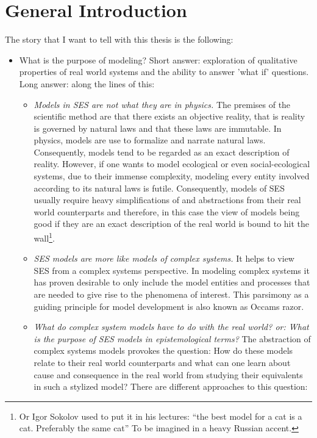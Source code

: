 \chapter{General Introduction}

The story that I want to tell with this thesis is the following:

\begin{itemize}
  \item What is the purpose of modeling? 
    Short answer: exploration of qualitative properties of real world systems and the ability to answer 'what if' questions.
    Long answer: along the lines of this:
    \begin{itemize}
      \item \emph{Models in SES are not what they are in physics.}
    The premises of the scientific method are that there exists an objective reality, that is reality is governed by natural laws and that these laws are immutable. In physics, models are use to formalize and narrate natural laws. Consequently, models tend to be regarded as an exact description of reality. However, if one wants to model ecological or even social-ecological systems, due to their immense complexity, modeling every entity involved according to its natural laws is futile. Consequently, models of SES usually require heavy simplifications of and abstractions from their real world counterparts and therefore, in this case the view of models being good if they are an exact description of the real world is bound to hit the wall\footnote{Or Igor Sokolov used to put it in his lectures: ``the best model for a cat is a cat. Preferably the same cat'' To be imagined in a heavy Russian accent.}.
  \item \emph{SES models are more like models of complex systems.}
    It helps to view SES from a complex systems perspective. In modeling complex systems it has proven desirable to only include the model entities and processes that are needed to give rise to the phenomena of interest. This parsimony as a guiding principle for model development is also known as Occams razor.
  \item \emph{What do complex system models have to do with the real world? or: What is the purpose of SES models in epistemological terms?}
    The abstraction of complex systems models provokes the question: How do these models relate to their real world counterparts and what can one learn about cause and consequence in the real world from studying their equivalents in such a stylized model?
    There are different approaches to this question:

\end{itemize}
\end{itemize}

